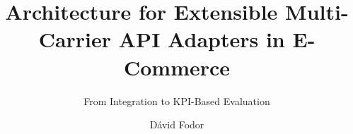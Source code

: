 \documentclass{imc-inf}
\title{Architecture for Extensible Multi-Carrier API Adapters in E-Commerce}
\subtitle{From Integration to KPI-Based Evaluation}
\author{Dávid Fodor}
\begin{document}
\frontmatter\maketitle{}

\begin{declarations}\end{declarations}



\end{document}
